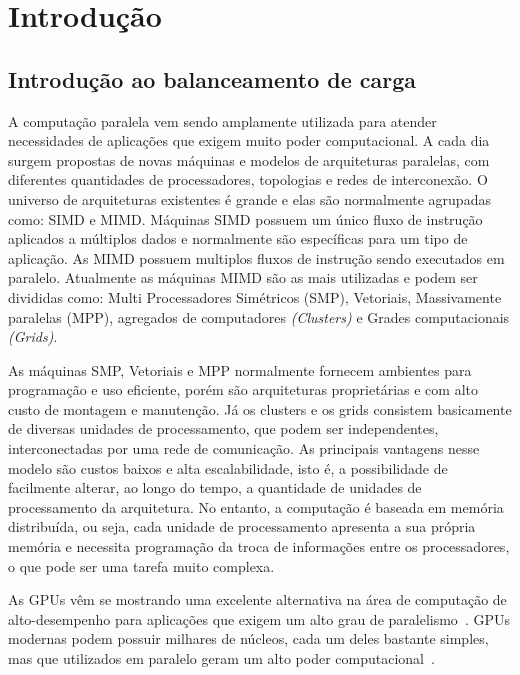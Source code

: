\cleardoublepage
\pagestyle{fancy}

\onehalfspacing

\chapter{Introdução}\label{intro}

\section{Introdução ao balanceamento de carga}\label{cap1:intro}

A computação paralela vem sendo amplamente utilizada para atender necessidades de aplicações que exigem muito poder computacional. A cada dia surgem propostas de novas máquinas e modelos de arquiteturas paralelas, com diferentes quantidades de processadores, topologias e redes de interconexão. O universo de arquiteturas existentes é grande e elas são normalmente agrupadas como: SIMD e MIMD. Máquinas SIMD possuem um único fluxo de instrução aplicados a múltiplos dados e normalmente são específicas para um tipo de aplicação. As MIMD possuem multiplos fluxos de instrução sendo executados em paralelo. Atualmente as máquinas MIMD são as mais utilizadas e podem ser divididas como: Multi Processadores Simétricos (SMP), Vetoriais, Massivamente paralelas (MPP), agregados de computadores \emph{(Clusters)} e Grades computacionais \emph{(Grids)}. 

As máquinas SMP, Vetoriais e MPP normalmente fornecem ambientes para programação e uso eficiente, porém são arquiteturas proprietárias e com alto custo de montagem e manutenção. Já os clusters e os grids consistem basicamente de diversas unidades de processamento, que podem ser independentes, interconectadas por uma rede de comunicação. As principais vantagens nesse modelo são custos baixos e alta escalabilidade, isto  é, a possibilidade de facilmente alterar, ao longo do tempo, a quantidade de unidades de processamento da arquitetura. No entanto, a computação é baseada em memória distribuída, ou seja, cada unidade de processamento apresenta a sua própria memória e necessita programação da troca de informações entre os processadores, o que pode ser uma tarefa muito complexa.

As GPUs vêm se mostrando uma excelente alternativa na área de computação de
alto-desempenho para aplicações que exigem um alto grau de
paralelismo~\citep{gpu}. GPUs modernas podem possuir milhares de núcleos, cada um
deles bastante simples, mas que utilizados em paralelo geram um alto poder
computacional~\citep{cuda}.

